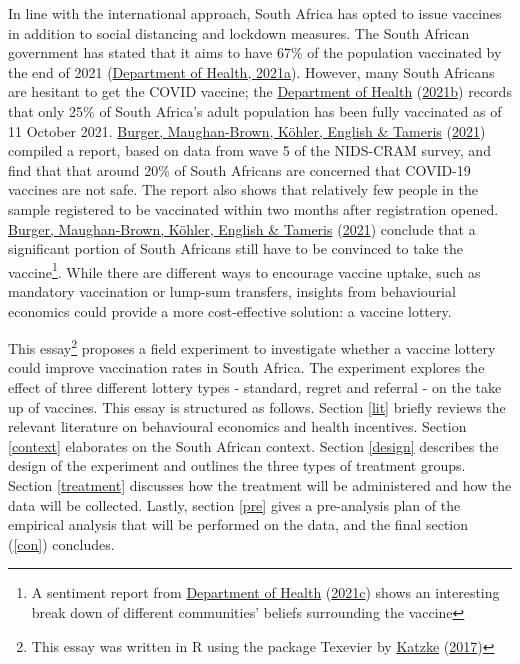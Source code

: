 \documentclass[11pt,preprint, authoryear]{elsarticle}
\numberwithin{equation}{section}
\numberwithin{figure}{section}
\numberwithin{table}{section}
\let\rmarkdownfootnote\footnote%
\def\footnote{\protect\rmarkdownfootnote}
\begin{document}
In line with the international approach, South Africa has opted to issue
vaccines in addition to social distancing and lockdown measures. The
South African government has stated that it aims to have 67\% of the
population vaccinated by the end of 2021
(\protect\hyperlink{ref-herd}{Department of Health, 2021a}). However,
many South Africans are hesitant to get the COVID vaccine; the
\protect\hyperlink{ref-stat}{Department of Health}
(\protect\hyperlink{ref-stat}{2021b}) records that only 25\% of South
Africa's adult population has been fully vaccinated as of 11 October
2021. \protect\hyperlink{ref-cram}{Burger, Maughan-Brown, Köhler,
English \& Tameris} (\protect\hyperlink{ref-cram}{2021}) compiled a
report, based on data from wave 5 of the NIDS-CRAM survey, and find that
that around 20\% of South Africans are concerned that COVID-19 vaccines
are not safe. The report also shows that relatively few people in the
sample registered to be vaccinated within two months after registration
opened. \protect\hyperlink{ref-cram}{Burger, Maughan-Brown, Köhler,
English \& Tameris} (\protect\hyperlink{ref-cram}{2021}) conclude that a
significant portion of South Africans still have to be convinced to take
the vaccine\footnote{A sentiment report from
  \protect\hyperlink{ref-report}{Department of Health}
  (\protect\hyperlink{ref-report}{2021c}) shows an interesting break
  down of different communities' beliefs surrounding the vaccine}. While
there are different ways to encourage vaccine uptake, such as mandatory
vaccination or lump-sum transfers, insights from behaviourial economics
could provide a more cost-effective solution: a vaccine lottery.

This essay\footnote{This essay was written in R using the package
  Texevier by \protect\hyperlink{ref-Texevier}{Katzke}
  (\protect\hyperlink{ref-Texevier}{2017})} proposes a field experiment
to investigate whether a vaccine lottery could improve vaccination rates
in South Africa. The experiment explores the effect of three different
lottery types - standard, regret and referral - on the take up of
vaccines. This essay is structured as follows. Section \ref{lit} briefly
reviews the relevant literature on behavioural economics and health
incentives. Section \ref{context} elaborates on the South African
context. Section \ref{design} describes the design of the experiment and
outlines the three types of treatment groups. Section \ref{treatment}
discusses how the treatment will be administered and how the data will
be collected. Lastly, section \ref{pre} gives a pre-analysis plan of the
empirical analysis that will be performed on the data, and the final
section (\ref{con}) concludes.
\end{document}

